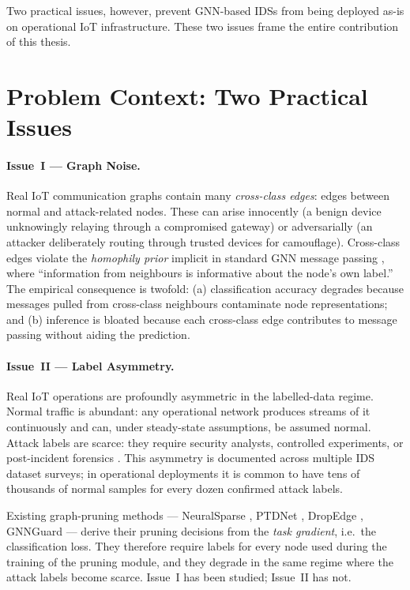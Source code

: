 \documentclass[11pt,a4paper]{report}
\theoremstyle{definition}
\theoremstyle{remark}
\begin{document}
Two practical issues, however, prevent GNN-based IDSs from being deployed
as-is on operational IoT infrastructure. These two issues frame the entire
contribution of this thesis.

\section{Problem Context: Two Practical Issues}

\paragraph{Issue~I --- Graph Noise.}
Real IoT communication graphs contain many \emph{cross-class edges}:
edges between normal and attack-related nodes. These can arise innocently
(a benign device unknowingly relaying through a compromised gateway) or
adversarially (an attacker deliberately routing through trusted devices
for camouflage). Cross-class edges violate the \emph{homophily prior}
implicit in standard GNN message passing
\cite{kipf2017semi,hamilton2017graphsage,velickovic2018gat}, where
``information from neighbours is informative about the node's own label.''
The empirical consequence is twofold: (a) classification accuracy
degrades because messages pulled from cross-class neighbours
contaminate node representations; and (b) inference is bloated because
each cross-class edge contributes to message passing without aiding the
prediction.

\paragraph{Issue~II --- Label Asymmetry.}
Real IoT operations are profoundly asymmetric in the labelled-data
regime. Normal traffic is abundant: any operational network produces
streams of it continuously and can, under steady-state assumptions, be
assumed normal. Attack labels are scarce: they require security
analysts, controlled experiments, or post-incident forensics
\cite{sommer2010outside,ring2019survey}. This asymmetry is documented
across multiple IDS dataset surveys; in operational deployments it is
common to have tens of thousands of normal samples for every dozen
confirmed attack labels.

Existing graph-pruning methods --- NeuralSparse \cite{zheng2020neuralsparse},
PTDNet \cite{luo2021ptdnet}, DropEdge \cite{rong2020dropedge}, GNNGuard
\cite{zhang2020gnnguard} --- derive their pruning decisions from the
\emph{task gradient}, i.e.\ the classification loss. They therefore
require labels for every node used during the training of the pruning
module, and they degrade in the same regime where the attack labels
become scarce. Issue~I has been studied; Issue~II has not.
\end{document}
